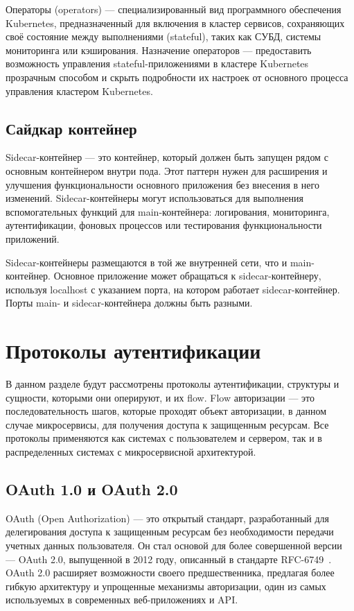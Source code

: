 Операторы (operators) --- специализированный вид программного обеспечения Kubernetes, предназначенный для включения в кластер сервисов, сохраняющих своё состояние между выполнениями (stateful), таких как СУБД, системы мониторинга или кэширования. Назначение операторов — предоставить возможность управления stateful-приложениями в кластере Kubernetes прозрачным способом и скрыть подробности их настроек от основного процесса управления кластером Kubernetes.

\subsection{Сайдкар контейнер}

Sidecar-контейнер --- это контейнер, который должен быть запущен рядом с основным контейнером внутри пода. Этот паттерн нужен для расширения и улучшения функциональности основного приложения без внесения в него изменений. Sidecar-контейнеры могут использоваться для выполнения вспомогательных функций для main-контейнера: логирования, мониторинга, аутентификации, фоновых процессов или тестирования функциональности приложений.

Sidecar-контейнеры размещаются в той же внутренней сети, что и main-контейнер. Основное приложение может обращаться к sidecar-контейнеру, используя localhost с указанием порта, на котором работает sidecar-контейнер. Порты main- и sidecar-контейнера должны быть разными.

\section{Протоколы аутентификации}
В данном разделе будут рассмотрены протоколы аутентификации, структуры и сущности, которыми они оперируют, и их flow. Flow авторизации --- это последовательность шагов, которые проходят объект авторизации, в данном случае микросервисы, для получения доступа к защищенным ресурсам.
Все протоколы применяются как системах с пользователем и сервером, так и в распределенных системах с микросервисной архитектурой.

\subsection{OAuth 1.0 и OAuth 2.0}
OAuth (Open Authorization) --- это открытый стандарт, разработанный для делегирования доступа к защищенным ресурсам без необходимости передачи учетных данных пользователя. Он стал основой для более совершенной версии — OAuth 2.0, выпущенной в 2012 году, описанный в стандарте RFC-6749~\cite{oauth2_spec}. OAuth 2.0 расширяет возможности своего предшественника, предлагая более гибкую архитектуру и упрощенные механизмы авторизации, один из самых используемых в современных веб-приложениях и API.~\cite{oauth2_artc}

